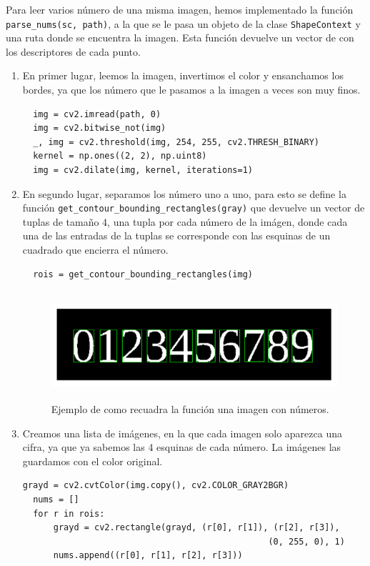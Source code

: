 \documentclass[size=a4, parskip=half, titlepage=false, toc=flat, toc=bib, 12pt]{scrartcl}
\begin{document}
Para leer varios número de una misma imagen, hemos implementado la función \verb|parse_nums(sc, path)|, a la que se le pasa un objeto de la clase \verb|ShapeContext| y una ruta donde se encuentra la imagen. Esta función devuelve un vector de con los descriptores de cada punto.
\begin{enumerate}

\item En primer lugar, leemos la imagen, invertimos el color y ensanchamos los bordes, ya que los número que le pasamos a la imagen a veces son muy finos.

\begin{verbatim}
  img = cv2.imread(path, 0)
  img = cv2.bitwise_not(img)
  _, img = cv2.threshold(img, 254, 255, cv2.THRESH_BINARY)
  kernel = np.ones((2, 2), np.uint8)
  img = cv2.dilate(img, kernel, iterations=1)
\end{verbatim}

\item En segundo lugar, separamos los número uno a uno, para esto se define la función \verb|get_contour_bounding_rectangles(gray)| que devuelve un vector de tuplas de tamaño 4, una tupla por cada número de la imágen, donde cada una de las entradas de la tuplas se corresponde con las esquinas de un cuadrado que encierra el número.

\begin{verbatim}
  rois = get_contour_bounding_rectangles(img)
\end{verbatim}

\begin{figure}[H]
\centering
\includegraphics[height=4cm]{./img/numeros}
\caption{Ejemplo de como recuadra la función una imagen con números.}
\end{figure}

\item Creamos una lista de imágenes, en la que cada imagen solo aparezca una cifra, ya que ya sabemos las 4 esquinas de cada número. La imágenes las guardamos con el color original.

\begin{verbatim}
grayd = cv2.cvtColor(img.copy(), cv2.COLOR_GRAY2BGR)
  nums = []
  for r in rois:
      grayd = cv2.rectangle(grayd, (r[0], r[1]), (r[2], r[3]),
                                                (0, 255, 0), 1)
      nums.append((r[0], r[1], r[2], r[3]))
\end{verbatim}


\end{enumerate}
\end{document}
